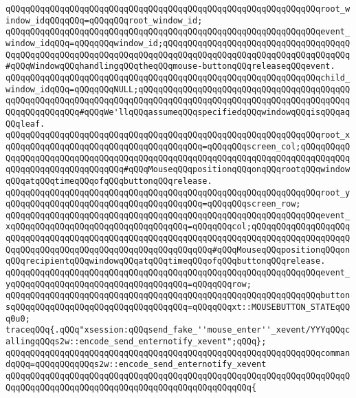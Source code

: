 \verb|qQQqqQQqqQQqqQQqqQQqqQQqqQQqqQQqqQQqqQQqqQQqqQQqqQQqqQQqqQQqqQQqroot_window_idqQQqqQQq=qQQqqQQqroot_window_id;|\newline
\verb|qQQqqQQqqQQqqQQqqQQqqQQqqQQqqQQqqQQqqQQqqQQqqQQqqQQqqQQqqQQqqQQqevent_window_idqQQq=qQQqqQQqwindow_id;qQQqqQQqqQQqqQQqqQQqqQQqqQQqqQQqqQQqqQQqqQQqqQQqqQQqqQQqqQQqqQQqqQQqqQQqqQQqqQQqqQQqqQQqqQQqqQQqqQQqqQQqqQQq#qQQqWindowqQQqhandlingqQQqtheqQQqmouse-buttonqQQqreleaseqQQqevent.|\newline
\verb|qQQqqQQqqQQqqQQqqQQqqQQqqQQqqQQqqQQqqQQqqQQqqQQqqQQqqQQqqQQqqQQqchild_window_idqQQq=qQQqqQQqNULL;qQQqqQQqqQQqqQQqqQQqqQQqqQQqqQQqqQQqqQQqqQQqqQQqqQQqqQQqqQQqqQQqqQQqqQQqqQQqqQQqqQQqqQQqqQQqqQQqqQQqqQQqqQQqqQQqqQQqqQQqqQQqqQQq#qQQqWe'llqQQqassumeqQQqspecifiedqQQqwindowqQQqisqQQqaqQQqleaf.|\newline
\verb|qQQqqQQqqQQqqQQqqQQqqQQqqQQqqQQqqQQqqQQqqQQqqQQqqQQqqQQqqQQqqQQqroot_xqQQqqQQqqQQqqQQqqQQqqQQqqQQqqQQqqQQqqQQq=qQQqqQQqscreen_col;qQQqqQQqqQQqqQQqqQQqqQQqqQQqqQQqqQQqqQQqqQQqqQQqqQQqqQQqqQQqqQQqqQQqqQQqqQQqqQQqqQQqqQQqqQQqqQQqqQQqqQQq#qQQqMouseqQQqpositionqQQqonqQQqrootqQQqwindowqQQqatqQQqtimeqQQqofqQQqbuttonqQQqrelease.|\newline
\verb|qQQqqQQqqQQqqQQqqQQqqQQqqQQqqQQqqQQqqQQqqQQqqQQqqQQqqQQqqQQqqQQqroot_yqQQqqQQqqQQqqQQqqQQqqQQqqQQqqQQqqQQqqQQq=qQQqqQQqscreen_row;|\newline
\verb|qQQqqQQqqQQqqQQqqQQqqQQqqQQqqQQqqQQqqQQqqQQqqQQqqQQqqQQqqQQqqQQqevent_xqQQqqQQqqQQqqQQqqQQqqQQqqQQqqQQqqQQq=qQQqqQQqcol;qQQqqQQqqQQqqQQqqQQqqQQqqQQqqQQqqQQqqQQqqQQqqQQqqQQqqQQqqQQqqQQqqQQqqQQqqQQqqQQqqQQqqQQqqQQqqQQqqQQqqQQqqQQqqQQqqQQqqQQqqQQqqQQqqQQq#qQQqMouseqQQqpositionqQQqonqQQqrecipientqQQqwindowqQQqatqQQqtimeqQQqofqQQqbuttonqQQqrelease.|\newline
\verb|qQQqqQQqqQQqqQQqqQQqqQQqqQQqqQQqqQQqqQQqqQQqqQQqqQQqqQQqqQQqqQQqevent_yqQQqqQQqqQQqqQQqqQQqqQQqqQQqqQQqqQQq=qQQqqQQqrow;|\newline
\verb|qQQqqQQqqQQqqQQqqQQqqQQqqQQqqQQqqQQqqQQqqQQqqQQqqQQqqQQqqQQqqQQqbuttonsqQQqqQQqqQQqqQQqqQQqqQQqqQQqqQQqqQQq=qQQqqQQqxt::MOUSEBUTTON_STATEqQQq0u0;|\newline
\newline
\verb|traceqQQq{.qQQq"xsession:qQQqsend_fake_''mouse_enter''_xevent/YYYqQQqcallingqQQqs2w::encode_send_enternotify_xevent";qQQq};|\newline
\verb|qQQqqQQqqQQqqQQqqQQqqQQqqQQqqQQqqQQqqQQqqQQqqQQqqQQqqQQqqQQqqQQqcommandqQQq=qQQqqQQqqQQqs2w::encode_send_enternotify_xevent|\newline
\verb|qQQqqQQqqQQqqQQqqQQqqQQqqQQqqQQqqQQqqQQqqQQqqQQqqQQqqQQqqQQqqQQqqQQqqQQqqQQqqQQqqQQqqQQqqQQqqQQqqQQqqQQqqQQqqQQqqQQqqQQq{|\newline
